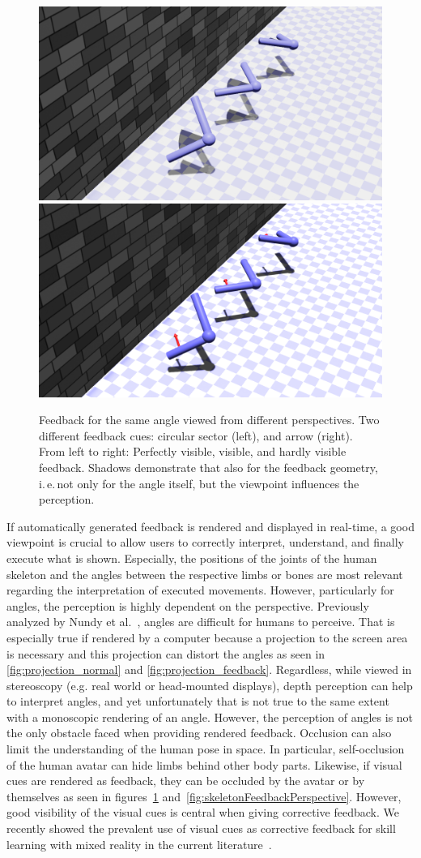 \begin{figure}[t!]
	\centering
	\includegraphics[width=0.49\linewidth]{pictures/projection_feedback}\hfill
	\includegraphics[width=0.49\linewidth]{pictures/projection_feedback_arrow}
	\caption{Feedback for the same angle viewed from different perspectives. Two different feedback cues: circular sector (left), and arrow (right). From left to right: Perfectly visible, visible, and hardly visible feedback. Shadows demonstrate that also for the feedback geometry, i.\,e.\,not only for the angle itself, but the viewpoint influences the perception.}
	\label{fig:projection_feedback}
\end{figure}

If automatically generated feedback is rendered and displayed in real-time, a good viewpoint is crucial to allow users to correctly interpret, understand, and finally execute what is shown. Especially, the positions of the joints of the human skeleton and the angles between the respective limbs or bones are most relevant regarding the interpretation of executed movements. However, particularly for angles, the perception is highly dependent on the perspective. Previously analyzed by Nundy et al.~\cite{nundy2000wam}, angles are difficult for humans to perceive. That is especially true if rendered by a computer because a projection to the screen area is necessary and this projection can distort the angles as seen in \autoref{fig:projection_normal} and \autoref{fig:projection_feedback}. Regardless, while viewed in stereoscopy (e.g. real world or head-mounted displays), depth perception can help to interpret angles, and yet unfortunately that is not true to the same extent with a monoscopic rendering of an angle. However, the perception of angles is not the only obstacle faced when providing rendered feedback. Occlusion can also limit the understanding of the human pose in space. In particular, self-occlusion of the human avatar can hide limbs behind other body parts.
Likewise, if visual cues are rendered as feedback, they can be occluded by the avatar or by themselves as seen in figures~\ref{fig:projection_feedback} and~\ref{fig:skeletonFeedbackPerspective}. However, good visibility of the visual cues is central when giving corrective feedback. We recently showed the prevalent use of visual cues as corrective feedback for skill learning with mixed reality in the current literature~\cite{diller2022vcb}.

